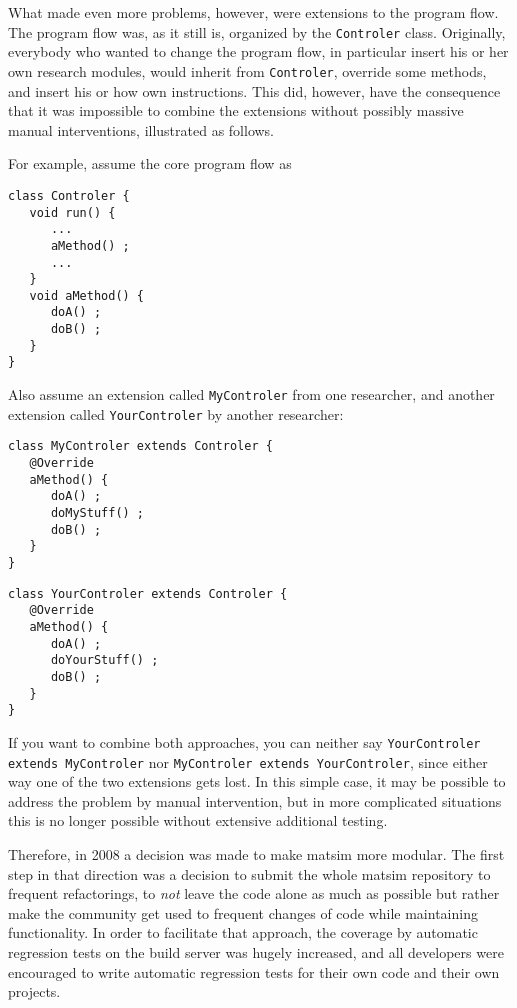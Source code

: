 What made even more problems, however, were extensions to the program flow.  The program flow was, as it still is, organized by the \lstinline$Controler$ class.  Originally, everybody who wanted to change the program flow, in particular insert his or her own research \glspl{module}, would inherit from \lstinline$Controler$, override some methods, and insert his or how own instructions.  This did, however, have the consequence that it was impossible to combine the \glspl{extension} without possibly massive manual interventions, illustrated as follows.

For example, assume the core program flow as
\begin{lstlisting}
class Controler {
   void run() {
      ...
      aMethod() ;
      ...
   }
   void aMethod() {
      doA() ;
      doB() ;
   }
}
\end{lstlisting}
Also assume an extension called \protect\lstinline$MyControler$
from one researcher, and another extension called \protect\lstinline$YourControler$ by another researcher:
\begin{lstlisting}
class MyControler extends Controler {
   @Override
   aMethod() {
      doA() ;
      doMyStuff() ;
      doB() ;
   }
}
\end{lstlisting}
\begin{lstlisting}
class YourControler extends Controler {
   @Override
   aMethod() {
      doA() ;
      doYourStuff() ;
      doB() ;
   }
}  
\end{lstlisting}
%
If you want to combine both approaches, you can neither say \protect\lstinline$YourControler extends MyControler$ nor \protect\lstinline$MyControler extends YourControler$, since either way one of the two extensions gets lost.  In this simple case, it may be possible to address the problem by manual intervention, but in more complicated situations this is no longer possible without extensive additional testing. %

Therefore, in 2008 a decision was made to make \gls{matsim} more modular.  The first step in that direction was a decision to submit the whole \gls{matsim} repository to frequent refactorings, \ie to \emph{not} leave the code alone as much as possible but rather make the community get used to frequent changes of code while maintaining functionality.  In order to facilitate that approach, the coverage by automatic regression tests on the build server was hugely increased, and all developers were encouraged to write automatic regression tests for their own code and their own projects. 

